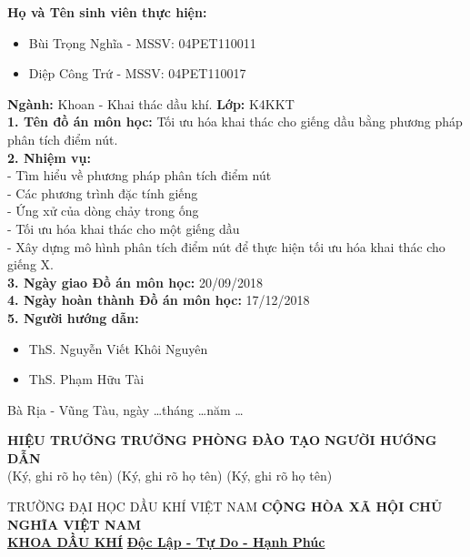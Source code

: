 \documentclass[12pt,a4paper]{report}
\begin{document}
\textbf{Họ và Tên sinh viên thực hiện:}
	\begin{itemize}
		\item Bùi Trọng Nghĩa - MSSV: 04PET110011
		\item Diệp Công Trứ - MSSV: 04PET110017
	\end{itemize}
\textbf{Ngành:} Khoan - Khai thác dầu khí. \hspace*{3cm}\textbf{Lớp:} K4KKT\\
\textbf{1. Tên đồ án môn học:} Tối ưu hóa khai thác cho giếng dầu bằng phương pháp phân tích điểm nút.\\
\textbf{2. Nhiệm vụ:} \\
\hspace*{1cm}- Tìm hiểu về phương pháp phân tích điểm nút\\
\hspace*{1cm}- Các phương trình đặc tính giếng\\
\hspace*{1cm}- Ứng xử của dòng chảy trong ống\\
\hspace*{1cm}- Tối ưu hóa khai thác cho một giếng dầu\\
\hspace*{1cm}- Xây dựng mô hình phân tích điểm nút để thực hiện tối ưu hóa khai thác cho giếng X.\\
\textbf{3. Ngày giao Đồ án môn học: }20/09/2018\\
\textbf{4. Ngày hoàn thành Đồ án môn học: }17/12/2018\\
\textbf{5. Người hướng dẫn: }
	\begin{itemize}
		\item ThS. Nguyễn Viết Khôi Nguyên
		\item ThS. Phạm Hữu Tài
	\end{itemize}
\begin{flushright}
Bà Rịa - Vũng Tàu, ngày \ldots tháng \ldots năm \ldots
\end{flushright}
\begingroup
\fontsize{12pt}{12pt}\selectfont
\textbf{HIỆU TRƯỞNG} \hspace{30pt} \textbf{TRƯỞNG PHÒNG ĐÀO TẠO} \hspace{30pt} \textbf{NGƯỜI HƯỚNG DẪN}\\
(Ký, ghi rõ họ tên) \hspace{60pt} (Ký, ghi rõ họ tên) \hspace{80pt} (Ký, ghi rõ họ tên)
\endgroup

\newpage

\begingroup
\fontsize{10pt}{12pt}\selectfont
TRƯỜNG ĐẠI HỌC DẦU KHÍ VIỆT NAM \hspace*{1.5cm} \textbf{CỘNG HÒA XÃ HỘI CHỦ NGHĨA VIỆT NAM}\\
\hspace*{1.7cm}\underline{\textbf{KHOA DẦU KHÍ}} \hspace*{4.4cm} \underline{\textbf{Độc Lập - Tự Do - Hạnh Phúc}}
\endgroup
\end{document}
